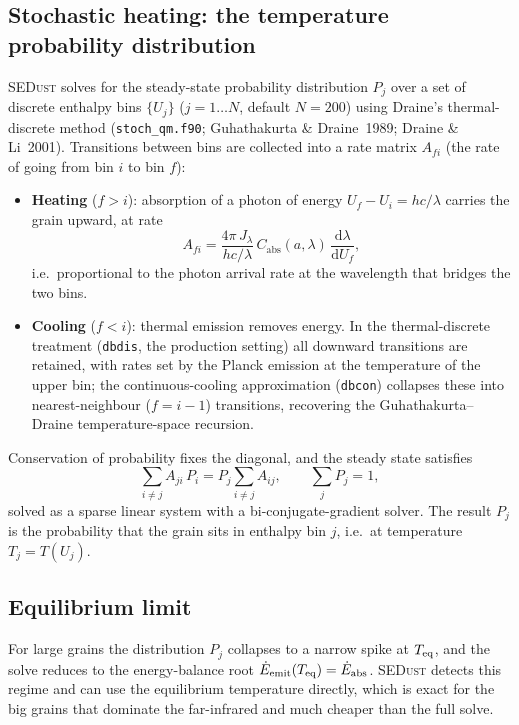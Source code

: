 \documentclass[english,a4paper]{kiseon_memo}
\newcommand{\Cabs}{C_{\mathrm{abs}}}
\newcommand{\Jlam}{J_\lambda}
\newcommand{\dd}{\mathrm{d}}
\newcommand{\code}[1]{\texttt{#1}}
\newcommand{\file}[1]{\texttt{#1}}
\begin{document}
\subsection{Stochastic heating: the temperature probability distribution}
\textsc{SEDust} solves for the steady-state probability distribution $P_j$ over
a set of discrete enthalpy bins $\{U_j\}$ ($j=1\ldots N$, default $N=200$) using
Draine's thermal-discrete method (\file{stoch\_qm.f90}; Guhathakurta \&
Draine~1989; Draine \& Li~2001).  Transitions between bins are collected into a
rate matrix $A_{fi}$ (the rate of going from bin $i$ to bin $f$):
\begin{itemize}
\item \textbf{Heating} ($f>i$): absorption of a photon of energy
      $U_f-U_i=hc/\lambda$ carries the grain upward, at rate
      \begin{equation}
        A_{fi} = \frac{4\pi\,\Jlam}{hc/\lambda}\,\Cabs(a,\lambda)\,
                 \frac{\dd\lambda}{\dd U_f},
      \end{equation}
      i.e.\ proportional to the photon arrival rate at the wavelength that
      bridges the two bins.
\item \textbf{Cooling} ($f<i$): thermal emission removes energy.  In the
      thermal-discrete treatment (\code{dbdis}, the production setting) all
      downward transitions are retained, with rates set by the Planck emission
      at the temperature of the upper bin; the continuous-cooling approximation
      (\code{dbcon}) collapses these into nearest-neighbour ($f=i-1$)
      transitions, recovering the Guhathakurta--Draine temperature-space
      recursion.
\end{itemize}
Conservation of probability fixes the diagonal, and the steady state satisfies
\begin{equation}
  \sum_{i\neq j} A_{ji}\,P_i = P_j \sum_{i\neq j} A_{ij},
  \qquad \sum_j P_j = 1,
\end{equation}
solved as a sparse linear system with a bi-conjugate-gradient solver.  The
result $P_j$ is the probability that the grain sits in enthalpy bin $j$, i.e.\
at temperature $T_j=T(U_j)$.

\subsection{Equilibrium limit}
For large grains the distribution $P_j$ collapses to a narrow spike at
$T_{\rm eq}$, and the solve reduces to the energy-balance root
$\dot E_{\rm emit}(T_{\rm eq})=\dot E_{\rm abs}$.  \textsc{SEDust} detects this
regime and can use the equilibrium temperature directly, which is exact for the
big grains that dominate the far-infrared and much cheaper than the full solve.
\end{document}

